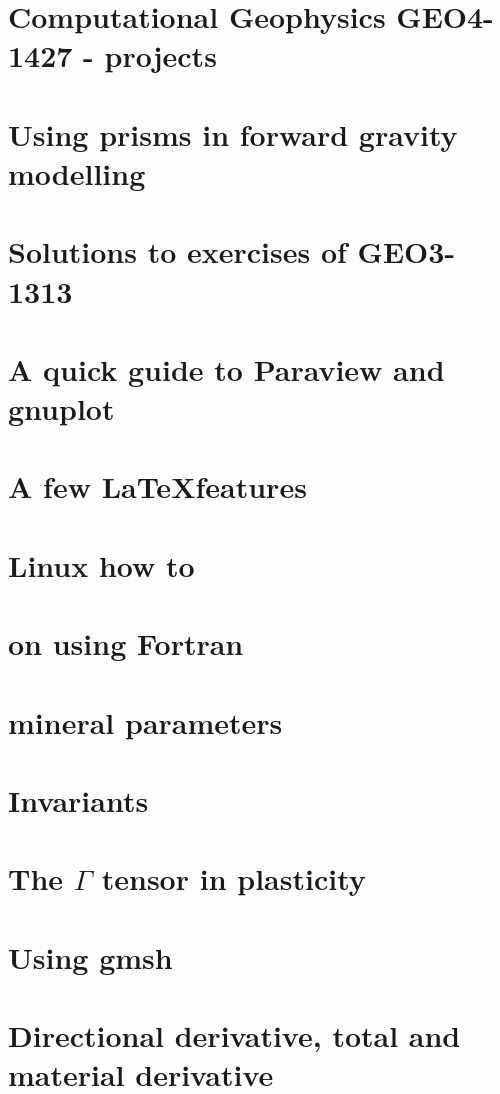 \documentclass[a4paper,12pt]{report}
\begin{document}
\chapter{Computational Geophysics GEO4-1427 - projects}  %
\chapter{Using prisms in forward gravity modelling \label{app:prisms}}  %
\chapter{Solutions to exercises of GEO3-1313 \label{app:gravsols}}  %
\chapter{A quick guide to Paraview and gnuplot}   %
\chapter{A few \LaTeX features}  %
\chapter{Linux how to}  %
\chapter{on using Fortran}  %
\chapter{mineral parameters}  %
\chapter{Invariants \label{app:invariants}}  %
\chapter{The $\Gamma$ tensor in plasticity}  %
\chapter{Using gmsh \label{app:gmsh}}  %
\chapter{Directional derivative, total and material derivative \label{app:ders}}  %

\printbibliography
\end{document}
